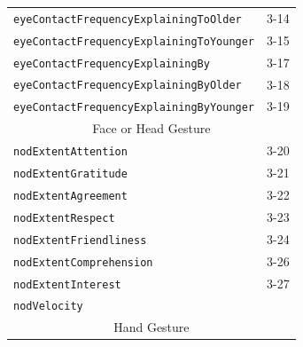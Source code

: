 \documentclass{CSSRforAfrica}
\begin{document}
\begin{table}[H]
\begin{center}
\begin{tabular}{|l l|}
{\footnotesize \verb+eyeContactFrequencyExplainingToOlder+} 	           & {\footnotesize 3-14} \vspace{-1.01mm}\\
{\footnotesize \verb+eyeContactFrequencyExplainingToYounger+} 	    & {\footnotesize 3-15 }\vspace{-1.01mm} \\
{\footnotesize \verb+eyeContactFrequencyExplainingBy+} 	                   & {\footnotesize 3-17 } \vspace{-1.01mm}\\
{\footnotesize \verb+eyeContactFrequencyExplainingByOlder+}     	    & {\footnotesize 3-18} \vspace{-1.01mm}\\
{\footnotesize \verb+eyeContactFrequencyExplainingByYounger+} 	    & {\footnotesize 3-19 }\\
\hline
\multicolumn{2}{|c|}{{\footnotesize Face or Head Gesture}} \\
\hline
{\footnotesize \verb+nodExtentAttention+} 	                           & {\footnotesize 3-20 }\vspace{-1.01mm} \\
{\footnotesize \verb+nodExtentGratitude+} 	                           & {\footnotesize 3-21}\vspace{-1.01mm} \\
{\footnotesize \verb+nodExtentAgreement+} 	                           & {\footnotesize   3-22 }\vspace{-1.01mm} \\
{\footnotesize \verb+nodExtentRespect+} 	                           & {\footnotesize   3-23}\vspace{-1.01mm} \\
{\footnotesize \verb+nodExtentFriendliness+} 	                           & {\footnotesize 3-24 }\vspace{-1.01mm} \\
{\footnotesize \verb+nodExtentComprehension+} 	                           & {\footnotesize 3-26}\vspace{-1.01mm} \\
{\footnotesize \verb+nodExtentInterest+} 	                           & {\footnotesize  3-27 }\vspace{-1.01mm} \\
{\footnotesize \verb+nodVelocity+} 	                   & {\footnotesize  }\\
\hline
\multicolumn{2}{|c|}{{\footnotesize Hand Gesture}} \\
\hline

\end{tabular}
\end{center}
\end{table}
\end{document}
